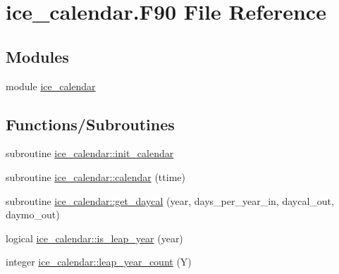 \hypertarget{ice__calendar_8F90}{
\section{ice\_\-calendar.F90 File Reference}
\label{ice__calendar_8F90}
}
\subsection*{Modules}
\begin{DoxyCompactItemize}
\item 
module \hyperlink{namespaceice__calendar}{ice\_\-calendar}
\end{DoxyCompactItemize}
\subsection*{Functions/Subroutines}
\begin{DoxyCompactItemize}
\item 
subroutine \hyperlink{namespaceice__calendar_a98202ec2aea2b959f54a058cd7d1387c}{ice\_\-calendar::init\_\-calendar}
\item 
subroutine \hyperlink{namespaceice__calendar_aa88caa12cfe780c61ddec5bfc825e93c}{ice\_\-calendar::calendar} (ttime)
\item 
subroutine \hyperlink{namespaceice__calendar_a69cff580919f3926456034ebbc574dac}{ice\_\-calendar::get\_\-daycal} (year, days\_\-per\_\-year\_\-in, daycal\_\-out, daymo\_\-out)
\item 
logical \hyperlink{namespaceice__calendar_a6cc159a7c73375fe57015ddc47dff35e}{ice\_\-calendar::is\_\-leap\_\-year} (year)
\item 
integer \hyperlink{namespaceice__calendar_aabc8501f17759aa61f9a704f13571258}{ice\_\-calendar::leap\_\-year\_\-count} (Y)
\end{DoxyCompactItemize}
